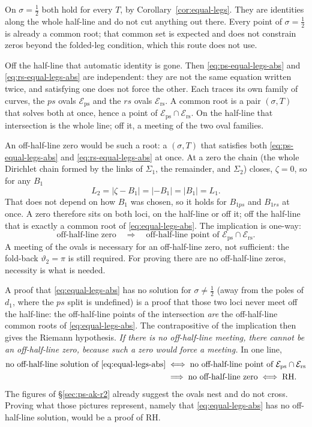 \documentclass[11pt]{article}
\theoremstyle{definition}
\begin{document}
On $\sigma=\tfrac12$ both hold for every $T$, by
Corollary~\ref{cor:equal-legs}. They are identities along the whole
half-line and do not cut anything out there. Every point of
$\sigma=\tfrac12$ is already a common root; that common set is expected
and does not constrain zeros beyond the folded-leg condition, which this
route does not use.

Off the half-line that automatic identity is gone. Then
\eqref{eq:ps-equal-legs-abs} and \eqref{eq:rs-equal-legs-abs} are
independent: they are not the same equation written twice, and satisfying
one does not force the other. Each traces its own family of curves, the
$ps$ ovals $\mathcal{E}_{\mathrm{ps}}$ and the $rs$ ovals
$\mathcal{E}_{\mathrm{rs}}$. A common root is a pair $(\sigma,T)$ that
solves both at once, hence a point of
$\mathcal{E}_{\mathrm{ps}}\cap\mathcal{E}_{\mathrm{rs}}$. On the half-line
that intersection is the whole line; off it, a meeting of the two oval
families.

An off-half-line zero would be such a root: a $(\sigma,T)$ that
satisfies both \eqref{eq:ps-equal-legs-abs} and
\eqref{eq:rs-equal-legs-abs} at once. At a zero the chain (the whole Dirichlet chain formed by the links of
$\Sigma_1$, the remainder, and $\Sigma_2$) closes,
$\zeta=0$, so for any $B_1$
\[
L_2=|\zeta-B_1|=|-B_1|=|B_1|=L_1.
\]
That does not depend on how $B_1$ was chosen, so it holds for $B_{1ps}$
and $B_{1rs}$ at once. A zero therefore sits on both loci, on the
half-line or off it; off the half-line that is exactly a common root of
\eqref{eq:equal-legs-abs}. The implication is one-way:
\[
\text{off-half-line zero}
\quad\Longrightarrow\quad
\text{off-half-line point of }\mathcal{E}_{\mathrm{ps}}\cap\mathcal{E}_{\mathrm{rs}}.
\]
A meeting of the ovals is necessary for an off-half-line zero, not
sufficient: the fold-back $\vartheta_2=\pi$ is still required. For
proving there are no off-half-line zeros, necessity is what is needed.

A proof that \eqref{eq:equal-legs-abs} has no solution for
$\sigma\neq\tfrac12$ (away from the poles of $d_1$, where the $ps$
split is undefined) is a proof that those two loci never meet off the
half-line: the off-half-line points of the intersection
\emph{are} the off-half-line common roots of \eqref{eq:equal-legs-abs}.
The contrapositive of the implication then gives the Riemann hypothesis.
\emph{If there is no off-half-line meeting, there cannot be an off-half-line
zero, because such a zero would force a meeting.} In one line,
\begin{align*}
\text{no off-half-line solution of \eqref{eq:equal-legs-abs}}
&\;\Longleftrightarrow\;
\text{no off-half-line point of }\mathcal{E}_{\mathrm{ps}}\cap\mathcal{E}_{\mathrm{rs}}
\\
&\;\Longrightarrow\;
\text{no off-half-line zero}
\;\Longleftrightarrow\;
\text{RH}.
\end{align*}
The figures of \S\ref{sec:ps-ak-r2} already suggest the ovals nest and do
not cross. Proving what those pictures represent, namely that
\eqref{eq:equal-legs-abs} has no off-half-line solution, would be a
proof of RH.
\end{document}
